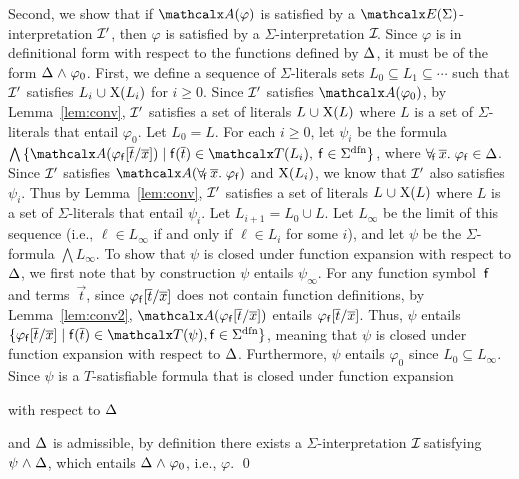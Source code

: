 \begin{proofsketch}
Second, we show that if $\conv( \varphi )$ is satisfied by a
$\extendsig{\Sigma}$-interpretation ${\mathcal{I}'}$, then $\varphi$ is satisfied by a
$\Sigma$-interpretation $\mathcal{I\!}$. Since $\varphi$ is in definitional form with
respect to the functions defined by $\DDD$, it must be of the form
$\DDD \wedge \varphi_0$.
First, we define a sequence of $\Sigma$-literals sets $L_0 \subseteq L_1 \subseteq \cdots$
such that ${\mathcal{I}'}$ satisfies $L_i \cup \absconstraints( L_i )$ for $i \geq 0$.
Since ${\mathcal{I}'}$ satisfies $\conv( \varphi_0 )$,
by Lemma~\ref{lem:conv},
${\mathcal{I}'}$ satisfies a set of literals $L \cup \absconstraints( L )$ where $L$ is a set of $\Sigma$-literals that entail $\varphi_0$.
Let $L_0 = L$.
For each $i \geq 0$,
let $\psi_i$ be the formula $\bigwedge\, \{ \conv( \varphi_{\con{f}}[ \vec t / \vec x ] ) \mid \con{f}( \vec t ) \in \terms( L_i ),\: \con{f} \in \sfundefs{\Sigma} \}$,
where $\forallf{\con{f}} \vec x.\; \varphi_{\con{f}} \in \DDD$.
Since ${\mathcal{I}'}$ satisfies $\conv( \forallf{\con{f}} \vec x.\; \varphi_{\con{f}} )$ and $\mathrm{X}( L_i )$,
we know that ${\mathcal{I}'}$ also satisfies $\psi_i$.
Thus by Lemma~\ref{lem:conv},
${\mathcal{I}'}$ satisfies a set of literals $L \cup \absconstraints( L )$ where $L$ is a set of $\Sigma$-literals that entail $\psi_i$.
Let $L_{i+1} = L_0 \cup L$.
Let $L_\infty$ be the limit of this sequence (i.e., $\ell \in L_\infty$ if and only if
$\ell \in L_i$ for some $i$),
and let $\psi$ be the $\Sigma$-formula $\bigwedge L_\infty$.
To show that $\psi$ is closed under function expansion with respect to $\DDD$,
we first note that by construction $\psi$ entails $\psi_\infty$.
For any function symbol~$\mathsf{f}$ and terms~$\vec t$, since $\varphi_{\mathsf{f}}[ \overline{t} / \overline{x} ]$ does not contain function definitions,
by Lemma~\ref{lem:conv2},
$\conv( \varphi_{\con{f}}[ \vec t / \vec x ] )$ entails $\varphi_{\mathsf{f}}[ \overline{t} / \overline{x} ]$.
Thus, $\psi$ entails $\{ \varphi_{\con{f}}[ \vec t / \vec x ] \mid \con{f}( \vec t ) \in \terms( \psi ), \con{f} \in \sfundefs{\Sigma} \}$,
meaning that $\psi$ is closed under function expansion with respect to $\DDD$.
Furthermore, $\psi$ entails $\varphi_0$ since $L_0 \subseteq L_\infty$.
Since $\psi$ is a $T$-satisfiable formula that is closed under function expansion\begin{rep} with respect to $\DDD$\end{rep} and $\DDD$ is admissible,
by definition there exists a $\Sigma$-interpretation $\mathcal{I\!}$ satisfying $\psi \wedge \DDD$, which entails $\DDD \wedge \varphi_0$,
i.e., $\varphi$.
\qed
\end{proofsketch}

